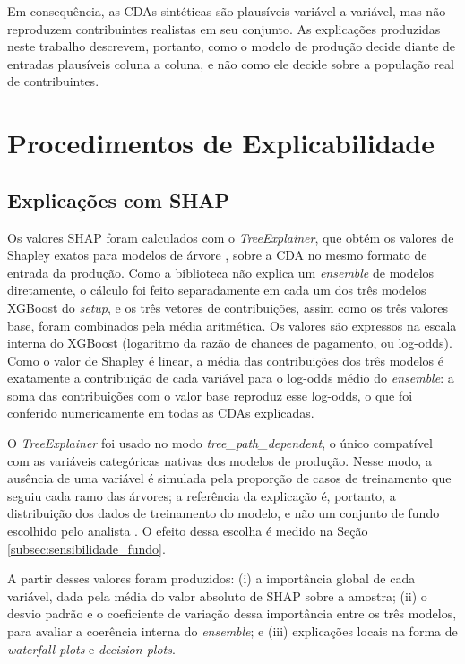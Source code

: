 Em consequência, as CDAs sintéticas são plausíveis variável a variável, mas não reproduzem contribuintes realistas em seu conjunto. As explicações produzidas neste trabalho descrevem, portanto, como o modelo de produção decide diante de entradas plausíveis coluna a coluna, e não como ele decide sobre a população real de contribuintes.

\section{Procedimentos de Explicabilidade}
\label{sec:procedimentos_xai}

\subsection{Explicações com SHAP}

Os valores SHAP foram calculados com o \textit{TreeExplainer}, que obtém os valores de Shapley exatos para modelos de árvore \cite{lundbergUnifiedApproachInterpreting2017}, sobre a CDA no mesmo formato de entrada da produção. Como a biblioteca não explica um \textit{ensemble} de modelos diretamente, o cálculo foi feito separadamente em cada um dos três modelos XGBoost do \textit{setup}, e os três vetores de contribuições, assim como os três valores base, foram combinados pela média aritmética. Os valores são expressos na escala interna do XGBoost (logaritmo da razão de chances de pagamento, ou log-odds). Como o valor de Shapley é linear, a média das contribuições dos três modelos é exatamente a contribuição de cada variável para o log-odds médio do \textit{ensemble}: a soma das contribuições com o valor base reproduz esse log-odds, o que foi conferido numericamente em todas as CDAs explicadas.

O \textit{TreeExplainer} foi usado no modo \textit{tree\_path\_dependent}, o único compatível com as variáveis categóricas nativas dos modelos de produção. Nesse modo, a ausência de uma variável é simulada pela proporção de casos de treinamento que seguiu cada ramo das árvores; a referência da explicação é, portanto, a distribuição dos dados de treinamento do modelo, e não um conjunto de fundo escolhido pelo analista \cite{lundbergLocalExplanationsGlobal2020, molnarInterpretableMachineLearning}. O efeito dessa escolha é medido na Seção \ref{subsec:sensibilidade_fundo}.

A partir desses valores foram produzidos: (i) a importância global de cada variável, dada pela média do valor absoluto de SHAP sobre a amostra; (ii) o desvio padrão e o coeficiente de variação dessa importância entre os três modelos, para avaliar a coerência interna do \textit{ensemble}; e (iii) explicações locais na forma de \textit{waterfall plots} e \textit{decision plots}.

